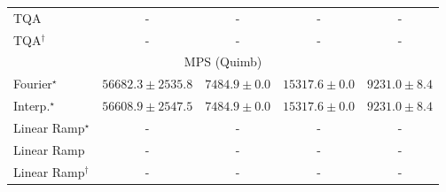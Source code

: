 \begin{tabular}{l|cccc|}
TQA & {\cellcolor[HTML]{000000}} \color[HTML]{F1F1F1} {\cellcolor{white}} \color{black} - & {\cellcolor[HTML]{000000}} \color[HTML]{F1F1F1} {\cellcolor{white}} \color{black} - & {\cellcolor[HTML]{000000}} \color[HTML]{F1F1F1} {\cellcolor{white}} \color{black} - & {\cellcolor[HTML]{000000}} \color[HTML]{F1F1F1} {\cellcolor{white}} \color{black} - \\
TQA$^\dagger$ & {\cellcolor[HTML]{000000}} \color[HTML]{F1F1F1} {\cellcolor{white}} \color{black} - & {\cellcolor[HTML]{000000}} \color[HTML]{F1F1F1} {\cellcolor{white}} \color{black} - & {\cellcolor[HTML]{000000}} \color[HTML]{F1F1F1} {\cellcolor{white}} \color{black} - & {\cellcolor[HTML]{000000}} \color[HTML]{F1F1F1} {\cellcolor{white}} \color{black} - \\
\cline{1-5}
\multicolumn{5}{c}{\rule{0pt}{8pt}MPS (Quimb)} \\
\midrule
Fourier$^\star$ & {\cellcolor[HTML]{662506}} \color[HTML]{F1F1F1} $56682.3\pm 2535.8$ & {\cellcolor[HTML]{FFFEE1}} \color[HTML]{000000} $7484.9\pm 0.0$ & {\cellcolor[HTML]{FFF0AD}} \color[HTML]{000000} $15317.6\pm 0.0$ & {\cellcolor[HTML]{FFFCD6}} \color[HTML]{000000} $9231.0\pm 8.4$ \\
Interp.$^\star$ & {\cellcolor[HTML]{662506}} \color[HTML]{F1F1F1} $56608.9\pm 2547.5$ & {\cellcolor[HTML]{FFFEE1}} \color[HTML]{000000} $7484.9\pm 0.0$ & {\cellcolor[HTML]{FFF0AD}} \color[HTML]{000000} $15317.6\pm 0.0$ & {\cellcolor[HTML]{FFFCD6}} \color[HTML]{000000} $9231.0\pm 8.4$ \\
Linear Ramp$^\star$ & {\cellcolor[HTML]{000000}} \color[HTML]{F1F1F1} {\cellcolor{white}} \color{black} - & {\cellcolor[HTML]{000000}} \color[HTML]{F1F1F1} {\cellcolor{white}} \color{black} - & {\cellcolor[HTML]{000000}} \color[HTML]{F1F1F1} {\cellcolor{white}} \color{black} - & {\cellcolor[HTML]{000000}} \color[HTML]{F1F1F1} {\cellcolor{white}} \color{black} - \\
Linear Ramp & {\cellcolor[HTML]{000000}} \color[HTML]{F1F1F1} {\cellcolor{white}} \color{black} - & {\cellcolor[HTML]{000000}} \color[HTML]{F1F1F1} {\cellcolor{white}} \color{black} - & {\cellcolor[HTML]{000000}} \color[HTML]{F1F1F1} {\cellcolor{white}} \color{black} - & {\cellcolor[HTML]{000000}} \color[HTML]{F1F1F1} {\cellcolor{white}} \color{black} - \\
Linear Ramp$^\dagger$ & {\cellcolor[HTML]{000000}} \color[HTML]{F1F1F1} {\cellcolor{white}} \color{black} - & {\cellcolor[HTML]{000000}} \color[HTML]{F1F1F1} {\cellcolor{white}} \color{black} - & {\cellcolor[HTML]{000000}} \color[HTML]{F1F1F1} {\cellcolor{white}} \color{black} - & {\cellcolor[HTML]{000000}} \color[HTML]{F1F1F1} {\cellcolor{white}} \color{black} - \\

\end{tabular}
